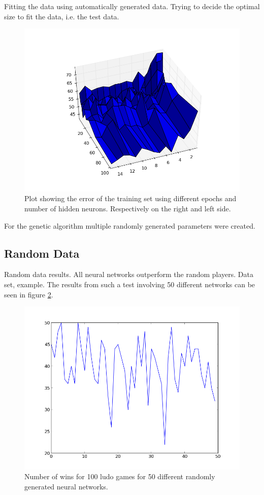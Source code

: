 \documentclass{llncs}
\begin{document}
Fitting the data using automatically generated data. Trying to decide the optimal size to fit the data, i.e. the test data.

\begin{figure}[t]
        \centering
		\includegraphics[scale=0.3]{../testing_fit_3D.png} 
        \caption{ Plot showing the error of the training set using different epochs and number of hidden neurons. Respectively on the right and left side.}\label{fig:3D}
\end{figure} 


For the genetic algorithm multiple randomly generated parameters were created.

\subsection*{Random Data}

Random data results. All neural networks outperform the random players. Data set, example.
The results from such a test involving 50 different networks can be seen in figure \ref{fig:random_50}.

\begin{figure}[t]
        \centering
		\includegraphics[scale=0.3]{../50_random_1.png} 
        \caption{ Number of wins for 100 ludo games for 50 different randomly generated neural networks. }\label{fig:random_50}
\end{figure} 
\end{document}
